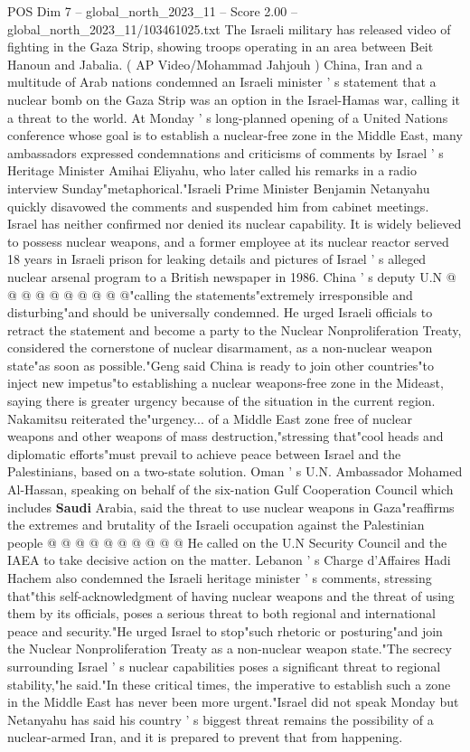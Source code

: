\begin{textsample}{POS Dim 7 – global\_north\_2023\_11 – Score 2.00 – global\_north\_2023\_11/103461025.txt}  \label{ex:f7_pos_406}
The Israeli military has released video of fighting in the Gaza Strip, showing troops operating in an area between Beit Hanoun and Jabalia. ( AP Video/Mohammad Jahjouh ) China, Iran and a multitude of Arab nations condemned an Israeli minister ' s statement that a nuclear bomb on the Gaza Strip was an option in the Israel-Hamas war, calling it a threat to the world.
At Monday ' s long-planned opening of a United Nations conference whose goal is to establish a nuclear-free zone in the Middle East, many ambassadors expressed condemnations and criticisms of comments by Israel ' s Heritage Minister Amihai Eliyahu, who later called his remarks in a radio interview Sunday"metaphorical."Israeli Prime Minister Benjamin Netanyahu quickly disavowed the comments and suspended him from cabinet meetings.
Israel has neither confirmed nor denied its nuclear capability.
It is widely believed to possess nuclear weapons, and a former employee at its nuclear reactor served 18 years in Israeli prison for leaking details and pictures of Israel ' s alleged nuclear arsenal program to a British newspaper in 1986.
China ' s deputy U.N @ @ @ @ @ @ @ @ @ @"calling the statements"extremely irresponsible and disturbing"and should be universally condemned.
He urged Israeli officials to retract the statement and become a party to the Nuclear Nonproliferation Treaty, considered the cornerstone of nuclear disarmament, as a non-nuclear weapon state"as soon as possible."Geng said China is ready to join other countries"to inject new impetus"to establishing a nuclear weapons-free zone in the Mideast, saying there is greater urgency because of the situation in the current region.
Nakamitsu reiterated the"urgency... of a Middle East zone free of nuclear weapons and other weapons of mass destruction,"stressing that"cool heads and diplomatic efforts"must prevail to achieve peace between Israel and the Palestinians, based on a two-state solution.
Oman ' s U.N.
Ambassador Mohamed Al-Hassan, speaking on behalf of the six-nation Gulf Cooperation Council which includes \textbf{Saudi} Arabia, said the threat to use nuclear weapons in Gaza"reaffirms the extremes and brutality of the Israeli occupation against the Palestinian people @ @ @ @ @ @ @ @ @ @ He called on the U.N Security Council and the IAEA to take decisive action on the matter.
Lebanon ' s Charge d'Affaires Hadi Hachem also condemned the Israeli heritage minister ' s comments, stressing that"this self-acknowledgment of having nuclear weapons and the threat of using them by its officials, poses a serious threat to both regional and international peace and security."He urged Israel to stop"such rhetoric or posturing"and join the Nuclear Nonproliferation Treaty as a non-nuclear weapon state."The secrecy surrounding Israel ' s nuclear capabilities poses a significant threat to regional stability,"he said."In these critical times, the imperative to establish such a zone in the Middle East has never been more urgent."Israel did not speak Monday but Netanyahu has said his country ' s biggest threat remains the possibility of a nuclear-armed Iran, and it is prepared to prevent that from happening.

\end{textsample}
